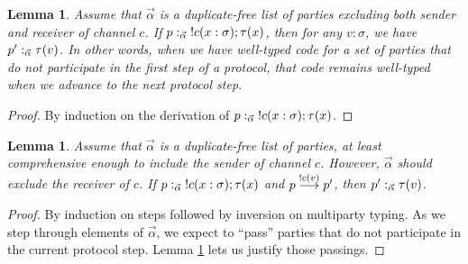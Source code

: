 \documentclass{amsbook}
\newtheorem{lemma}[theorem]{Lemma}
\theoremstyle{definition}
\theoremstyle{remark}
\numberwithin{section}{chapter}
\numberwithin{equation}{chapter}
\begin{document}
\begin{lemma}\label{preserve_unused}
  Assume that $\vec{\alpha}$ is a duplicate-free list of parties excluding both sender and receiver of channel $c$.
  If $p :_{\vec{\alpha}} \; !c(x : \sigma); \tau(x)$, then for any $v : \sigma$, we have $p' :_{\vec{\alpha}} \tau(v)$.
  In other words, when we have well-typed code for a set of parties that do not participate in the first step of a protocol, that code remains well-typed when we advance to the next protocol step.
\end{lemma}
\begin{proof}
  By induction on the derivation of $p :_{\vec{\alpha}} \; !c(x : \sigma); \tau(x)$.
\end{proof}

\begin{lemma}\label{find_sender}
  Assume that $\vec{\alpha}$ is a duplicate-free list of parties, at least comprehensive enough to include the sender of channel $c$.
  However, $\vec{\alpha}$ should \emph{exclude} the receiver of $c$.
  If $p :_{\vec{\alpha}} \; !c(x : \sigma); \tau(x)$ and $p \stackrel{!c(v)}{\longrightarrow} p'$, then $p' :_{\vec{\alpha}} \tau(v)$.
\end{lemma}
\begin{proof}
  By induction on steps followed by inversion on multiparty typing.
  As we step through elements of $\vec{\alpha}$, we expect to ``pass'' parties that do not participate in the current protocol step.
  Lemma \ref{preserve_unused} lets us justify those passings.
\end{proof}
\end{document}
